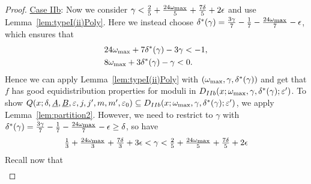 \documentclass{amsart}
\numberwithin{equation}{section}
\begin{document}
\begin{proof}
\medskip
\underline{Case IIb}: 
Now we consider $\gamma <  \tfrac{2}{5}+\tfrac{24\omega_{\begin{scriptsize}
\mbox{max}\end{scriptsize}}}{5} +\tfrac{7\delta}{5}  +2\epsilon$ and  use  Lemma~\ref{lem:typeI(ii)Poly}. Here we instead choose  
$\delta^*(\gamma) =  \frac{3\gamma}{7}-\frac{1}{7}  -\frac{24\omega_{\begin{scriptsize}
\mbox{max}\end{scriptsize}}}{7} -\epsilon$, which ensures that 
 \begin{align*}
&24\omega_{\begin{scriptsize}
\mbox{max}\end{scriptsize}} + 7\delta^*(\gamma) -3\gamma <-1, \\
&8\omega_{\begin{scriptsize}
\mbox{max}\end{scriptsize}} + 3\delta^*(\gamma) -\gamma <0.
\end{align*}
Hence we can apply Lemma~\ref{lem:typeI(ii)Poly} with $(\omega_{\begin{scriptsize}
\mbox{max}
\end{scriptsize}}, \gamma, \delta^*(\gamma))$ and get that $f$ has good equidistribution properties for moduli in $D_{IIb}(x;\omega_{\begin{scriptsize}
\mbox{max}
\end{scriptsize}},\gamma,\delta^*(\gamma);\varepsilon')$. To show    $ Q(x;\delta,\underline{A},\underline{B},\varepsilon,j,j',m,m',\varepsilon_0) \subseteq D_{IIb}(x;\omega_{\begin{scriptsize}
\mbox{max}
\end{scriptsize}},\gamma,\delta^*(\gamma);\varepsilon')$, we  apply Lemma~\ref{lem:partition2}. However, we need to restrict to $\gamma$ with 
$
\delta^*(\gamma) =   \frac{3\gamma}{7}-\frac{1}{7}  -\frac{24\omega_{\begin{scriptsize}
\mbox{max}\end{scriptsize}}}{7}  - \epsilon \geq \delta$, so   have $$   \tfrac{1}{3}+\tfrac{24\omega_{\begin{scriptsize}
\mbox{max}\end{scriptsize}}}{3} +\tfrac{7\delta}{3}  +3\epsilon< \gamma <   \tfrac{2}{5}+\tfrac{24\omega_{\begin{scriptsize}
\mbox{max}\end{scriptsize}}}{5} +\tfrac{7\delta}{5}  +2\epsilon $$
Recall now that
\begin{align*}

\end{align*}
\end{proof}
\end{document}
